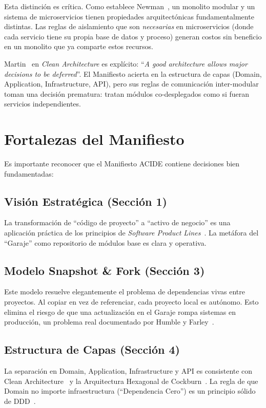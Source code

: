 \documentclass[conference]{IEEEtran}
\begin{document}
Esta distinci\'on es cr\'itica. Como establece Newman~\cite{newman2019}, un monolito modular y un sistema de microservicios tienen propiedades arquitect\'onicas fundamentalmente distintas. Las reglas de aislamiento que son \textit{necesarias} en microservicios (donde cada servicio tiene su propia base de datos y proceso) generan costos sin beneficio en un monolito que ya comparte estos recursos.

Martin~\cite{martin2017} en \textit{Clean Architecture} es expl\'icito: ``\textit{A good architecture allows major decisions to be deferred}''. El Manifiesto acierta en la estructura de capas (Domain, Application, Infrastructure, API), pero sus reglas de comunicaci\'on inter-modular toman una decisi\'on prematura: tratan m\'odulos co-desplegados como si fueran servicios independientes.


\section{Fortalezas del Manifiesto}
\label{sec:fortalezas}

Es importante reconocer que el Manifiesto ACIDE contiene decisiones bien fundamentadas:

\subsection{Visi\'on Estrat\'egica (Secci\'on 1)}
La transformaci\'on de ``c\'odigo de proyecto'' a ``activo de negocio'' es una aplicaci\'on pr\'actica de los principios de \textit{Software Product Lines}~\cite{pohl2005}. La met\'afora del ``Garaje'' como repositorio de m\'odulos base es clara y operativa.

\subsection{Modelo Snapshot \& Fork (Secci\'on 3)}
Este modelo resuelve elegantemente el problema de dependencias vivas entre proyectos. Al copiar en vez de referenciar, cada proyecto local es aut\'onomo. Esto elimina el riesgo de que una actualizaci\'on en el Garaje rompa sistemas en producci\'on, un problema real documentado por Humble y Farley~\cite{humble2010}.

\subsection{Estructura de Capas (Secci\'on 4)}
La separaci\'on en Domain, Application, Infrastructure y API es consistente con Clean Architecture~\cite{martin2017} y la Arquitectura Hexagonal de Cockburn~\cite{cockburn2005}. La regla de que Domain no importe infraestructura (``Dependencia Cero'') es un principio s\'olido de DDD~\cite{evans2003}.
\end{document}
